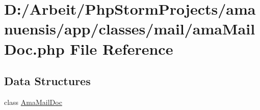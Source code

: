 \hypertarget{ama_mail_doc_8php}{}\section{D\+:/\+Arbeit/\+Php\+Storm\+Projects/amanuensis/app/classes/mail/ama\+Mail\+Doc.php File Reference}
\label{ama_mail_doc_8php}
\subsection*{Data Structures}
\begin{DoxyCompactItemize}
\item 
class \hyperlink{class_ama_mail_doc}{Ama\+Mail\+Doc}
\end{DoxyCompactItemize}
